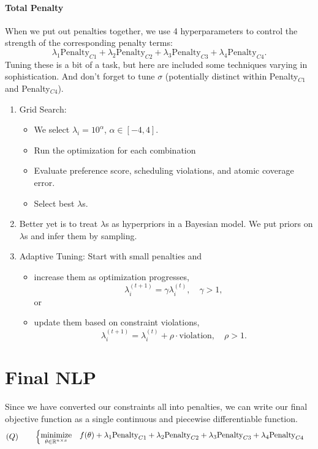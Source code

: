 \documentclass{article}
\begin{document}
\paragraph{Total Penalty}
When we put out penalties together, we use 4 hyperparameters to control the strength of the corresponding penalty terms:
    \[\lambda_1\text{Penalty}_{C1}+\lambda_2\text{Penalty}_{C2}+\lambda_3\text{Penalty}_{C3}+\lambda_4\text{Penalty}_{C4}.\]
Tuning these is a bit of a task, but here are included some techniques varying in sophistication. And don't forget to tune $\sigma$ (potentially distinct within Penalty$_{C1}$ and Penalty$_{C4}$).
\begin{enumerate}
    \item Grid Search:
    \begin{itemize}
        \item We select $\lambda_i=10^\alpha$, $\alpha\in[-4,4]$.
        \item Run the optimization for each combination
        \item Evaluate preference score, scheduling violations, and atomic coverage error.
        \item Select best $\lambda$s.
    \end{itemize}
    \item Better yet is to treat $\lambda$s as hyperpriors in a Bayesian model. We put priors on $\lambda$s and infer them by sampling.
    \item Adaptive Tuning: Start with small penalties and
    \begin{itemize}
        \item increase them as optimization progresses,
            \[\lambda_i^{(t+1)}=\gamma\lambda_i^{(t)},\quad\gamma>1,\]
        or
        \item update them based on constraint violations,
            \[\lambda_i^{(t+1)}=\lambda_i^{(t)}+\rho\cdot\text{violation},\quad\rho>1.\]
    \end{itemize}
\end{enumerate}


\section*{Final NLP}
Since we have converted our constraints all into penalties, we can write our final objective function as a single continuous and piecewise differentiable function.
    \[(Q)\qquad\begin{cases}\underset{ \mathbf \theta \in \operatorname{\mathbb{R}}^{n\times x}}{\text{minimize}}\quad f(\theta)+\lambda_1\text{Penalty}_{C1}+\lambda_2\text{Penalty}_{C2}+\lambda_3\text{Penalty}_{C3}+\lambda_4\text{Penalty}_{C4}\end{cases}\]
\end{document}
